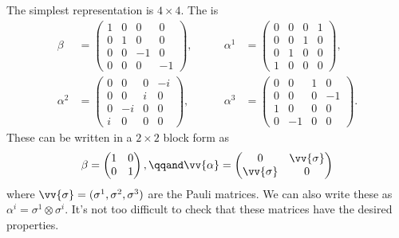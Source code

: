 The simplest representation is \(4 \times 4\).
The  is
\begin{align}
    \beta &= 
    \begin{pmatrix}
        1 & 0 & 0 & 0\\
        0 & 1 & 0 & 0\\
        0 & 0 & -1 & 0\\
        0 & 0 & 0 & -1
    \end{pmatrix}
    , \qquad & \alpha^1 &=
    \begin{pmatrix}
        0 & 0 & 0 & 1\\
        0 & 0 & 1 & 0\\
        0 & 1 & 0 & 0\\
        1 & 0 & 0 & 0
    \end{pmatrix}
    ,\\
    \alpha^2 &= 
    \begin{pmatrix}
        0 & 0 & 0 & -i\\
        0 & 0 & i & 0\\
        0 & -i & 0 & 0\\
        i & 0 & 0 & 0
    \end{pmatrix}
    , \qquad & \alpha^3 &= 
    \begin{pmatrix}
        0 & 0 & 1 & 0\\
        0 & 0 & 0 &-1\\
        1 & 0 & 0 & 0\\
        0 & -1 & 0 & 0
    \end{pmatrix}
    .
\end{align}
These can be written in a \(2\times 2\) block form as
\begin{equation}
    \beta = 
    \begin{pmatrix}
        1 & 0\\
        0 & 1
    \end{pmatrix}
    , \qqand \vv{\alpha} = 
    \begin{pmatrix}
        0 & \vv{\sigma}\\
        \vv{\sigma} & 0
    \end{pmatrix}
\end{equation}
where \(\vv{\sigma} = (\sigma^1, \sigma^2, \sigma^3)\) are the Pauli matrices.
We can also write these as \(\alpha^i = \sigma^1 \otimes \sigma^i\).
It's not too difficult to check that these matrices have the desired properties.


